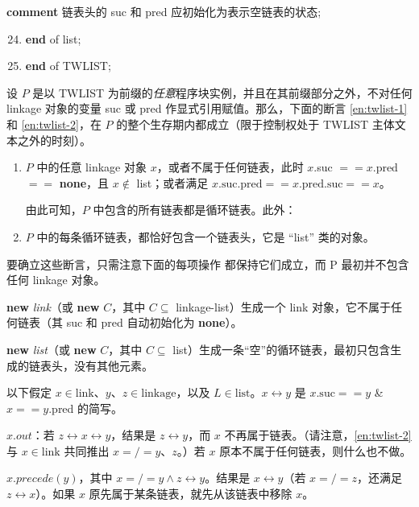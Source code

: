 \documentclass[twoside,11pt,fontset=none]{ctexbook}
\begin{document}
\parindent\quad \quad \quad \quad \textbf{comment} 链表头的 suc 和 pred 应初始化为表示空链表的状态;

\begin{enumerate}[nosep, label=\arabic*.]
	\setcounter{enumi}{23}

	\item \quad \textbf{end} of list;
	\item \textbf{end} of TWLIST;
\end{enumerate}

设 $P$ 是以 TWLIST 为前缀的\textit{任意}程序块实例，并且在其前缀部分之外，不对任何 linkage 对象的变量 suc 或 pred 作显式引用赋值。那么，下面的断言 \ref{en:twlist-1} 和 \ref{en:twlist-2}，在 $P$ 的整个生存期内都成立（限于控制权处于 TWLIST 主体文本之外的时刻）。

\begin{enumerate}[wide, nosep, label=(\arabic*)]
	\item \label{en:twlist-1}
	$P$ 中的任意 linkage 对象 $x$，或者不属于任何链表，此时 $x$.suc $== x$.pred $==$ \textbf{none}，且 $x \notin$ list；或者满足 $x\text{.suc.pred} == x\text{.pred.suc} == x$。
	
	由此可知，$P$ 中包含的所有链表都是循环链表。此外：
	
	\item \label{en:twlist-2}
	$P$ 中的每条循环链表，都恰好包含一个链表头，它是 ``list'' 类的对象。
\end{enumerate}

要确立这些断言，只需注意下面的每项操作
都保持它们成立，而 P 最初并不包含任何 linkage 对象。

\noindent
\textbf{new} \textit{link}（或 \textbf{new} $C$，其中 $C \subseteq$ linkage-list）生成一个 link 对象，它不属于任何链表（其 suc 和 pred 自动初始化为 \textbf{none}）。

\noindent
\textbf{new} \textit{list}（或 \textbf{new} $C$，其中 $C \subseteq$ list）生成一条“空”的循环链表，最初只包含生成的链表头，没有其他元素。

\noindent
以下假定 $x \in \text{link}$、$y$、$z \in \text{linkage}$，以及 $L \in \text{list}$。$x \leftrightarrow y$ 是 $x.\text{suc} == y$ \& $x == y$.pred 的简写。

\noindent
$x.out$：若 $z \leftrightarrow x \leftrightarrow y$，结果是 $z \leftrightarrow y$，而 $x$ 不再属于链表。（请注意，\ref{en:twlist-2} 与 $x \in \text{link}$ 共同推出 $x =/= y$、$z$。）若 $x$ 原本不属于任何链表，则什么也不做。

\noindent
$x.precede(y)$，其中 $x =/= y \land z \leftrightarrow y$。结果是 $x \leftrightarrow y$（若 $x =/= z$，还满足 $z \leftrightarrow x$）。如果 $x$ 原先属于某条链表，就先从该链表中移除 $x$。
\end{document}
